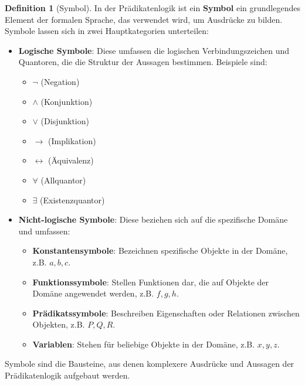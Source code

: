 \documentclass{book}
\theoremstyle{plain}
\theoremstyle{remark}
\theoremstyle{definition}
\newtheorem{definition}{Definition}[section]
\begin{document}
\begin{definition}[Symbol]
In der Prädikatenlogik ist ein \textbf{Symbol} ein grundlegendes Element der formalen Sprache, das verwendet wird, um Ausdrücke zu bilden. Symbole lassen sich in zwei Hauptkategorien unterteilen:

\begin{itemize}
    \item \textbf{Logische Symbole}: Diese umfassen die logischen Verbindungszeichen und Quantoren, die die Struktur der Aussagen bestimmen. Beispiele sind:
    \begin{itemize}
        \item \(\neg\) (Negation)
        \item \(\land\) (Konjunktion)
        \item \(\lor\) (Disjunktion)
        \item \(\rightarrow\) (Implikation)
        \item \(\leftrightarrow\) (Äquivalenz)
        \item \(\forall\) (Allquantor)
        \item \(\exists\) (Existenzquantor)
    \end{itemize}
    
    \item \textbf{Nicht-logische Symbole}: Diese beziehen sich auf die spezifische Domäne und umfassen:
    \begin{itemize}
        \item \textbf{Konstantensymbole}: Bezeichnen spezifische Objekte in der Domäne, z.B. \(a, b, c\).
        \item \textbf{Funktionssymbole}: Stellen Funktionen dar, die auf Objekte der Domäne angewendet werden, z.B. \(f, g, h\).
        \item \textbf{Prädikatssymbole}: Beschreiben Eigenschaften oder Relationen zwischen Objekten, z.B. \(P, Q, R\).
        \item \textbf{Variablen}: Stehen für beliebige Objekte in der Domäne, z.B. \(x, y, z\).
    \end{itemize}
\end{itemize}

Symbole sind die Bausteine, aus denen komplexere Ausdrücke und Aussagen der Prädikatenlogik aufgebaut werden.
\end{definition}
\end{document}
